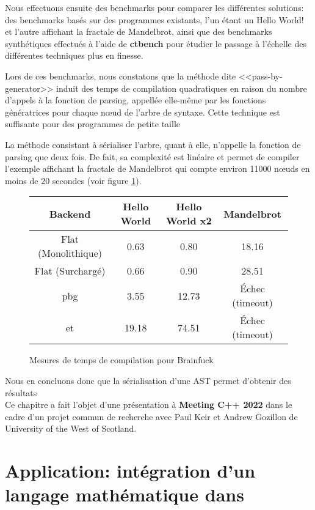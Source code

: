 \documentclass[main]{subfiles}
\begin{document}
Nous effectuons ensuite des benchmarks pour comparer
les diff\'erentes solutions: des benchmarks bas\'es sur
des programmes existants, l'un \'etant un Hello World! et l'autre affichant
la fractale de Mandelbrot, ainsi que des benchmarks synth\'etiques effectu\'es
\`a l'aide de \textbf{ctbench} pour \'etudier le passage \`a l'\'echelle
des diff\'erentes techniques plus en finesse.

Lors de ces benchmarks, nous constatons que la m\'ethode dite
<<pass-by-generator>> induit des temps de compilation quadratiques en raison
du nombre d'appels \`a la fonction de parsing, appell\'ee elle-m\^eme par les
fonctions g\'en\'eratrices pour chaque n\oe{}ud de l'arbre de syntaxe.
Cette technique est suffisante pour des programmes de petite taille

La m\'ethode consistant \`a s\'erialiser l'arbre, quant \`a elle, n'appelle
la fonction de parsing que deux fois. De fait, sa complexit\'e est lin\'eaire
et permet de compiler l'exemple affichant la fractale de Mandelbrot qui compte
environ 11000 n\oe{}uds en moins de 20 secondes (voir figure
\ref{fig:bf-compile-times-fr}).

\begin{figure}[h]
\begin{tabular}{|c|c|c|c|}
\hline
Backend           & Hello World & Hello World x2  & Mandelbrot \\
\hline
Flat (Monolithique) & 0.63        & 0.80            & 18.16 \\
Flat (Surcharg\'e)  & 0.66        & 0.90            & 28.51 \\
\gls{pbg}           & 3.55        & 12.73           & \'Echec (timeout) \\
\gls{et}            & 19.18       & 74.51           & \'Echec (timeout) \\
\hline
\end{tabular}
\caption{Mesures de temps de compilation pour Brainfuck}
\label{fig:bf-compile-times-fr}
\end{figure}

Nous en concluons donc que la s\'erialisation d'une AST permet d'obtenir des
r\'esultats
\\

Ce chapitre a fait l'objet d'une pr\'esentation \`a \textbf{Meeting C++ 2022}
dans le cadre d'un projet commun de recherche avec Paul Keir et Andrew Gozillon
de University of the West of Scotland.

\section{
  Application: int\'egration d'un langage math\'ematique dans \cpp
}
\end{document}
